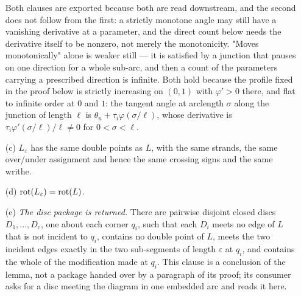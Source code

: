 \begin{lemma}[rounding]
\begin{enumerate}
Both clauses are exported because both are read downstream, and the second does
not follow from the first: a strictly monotone angle may still have a vanishing
derivative at a parameter, and the direct count below needs the derivative
itself to be nonzero, not merely the monotonicity. "Moves monotonically" alone
is weaker still --- it is
satisfied by a junction that pauses on one direction for a whole sub-arc, and
then a count of the parameters carrying a prescribed direction is infinite. Both
hold because the profile fixed in the proof below is strictly increasing on
$(0,1)$ with $\varphi'>0$ there, and flat to infinite order at $0$ and $1$: the
tangent angle at arclength $\sigma$ along the junction of length $\ell$ is
$\theta_u+\tau_i\varphi(\sigma/\ell)$, whose derivative is
$\tau_i\varphi'(\sigma/\ell)/\ell\neq0$ for $0<\sigma<\ell$.
\item[(c)] $L_\varepsilon$ has the same double points as $L$, with the same
strands, the same over/under assignment and hence the same crossing signs and
the same writhe.
\item[(d)] $\operatorname{rot}(L_\varepsilon)=\operatorname{rot}(L)$.
\item[(e)] \emph{The disc package is returned.} There are pairwise disjoint
closed discs $D_1,\dots,D_c$, one about each corner $q_i$, such that each $D_i$
meets no edge of $L$ that is not incident to $q_i$, contains no double point of
$L$, meets the two incident edges exactly in the two sub-segments of length
$\varepsilon$ at $q_i$, and contains the whole of the modification made at
$q_i$. This clause is a conclusion of the lemma, not a package handed over by a
paragraph of its proof; its consumer asks for a disc meeting the diagram in one
embedded arc and reads it here.
\end{enumerate}
\end{lemma}
